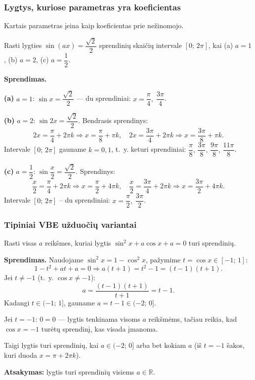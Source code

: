 \subsubsection{Lygtys, kuriose parametras yra koeficientas}

Kartais parametras įeina kaip koeficientas prie nežinomojo.

\begin{example}
Rasti lygties \(\sin(ax) = \dfrac{\sqrt{2}}{2}\) sprendinių skaičių intervale \([0;\, 2\pi]\), kai (a) \(a = 1\), (b) \(a = 2\), (c) \(a = \dfrac{1}{2}\).

\textbf{Sprendimas.}

\textbf{(a)} \(a = 1\): \(\sin x = \dfrac{\sqrt{2}}{2}\) — du sprendiniai: \(x = \dfrac{\pi}{4},\; \dfrac{3\pi}{4}\).

\textbf{(b)} \(a = 2\): \(\sin 2x = \dfrac{\sqrt{2}}{2}\). Bendrasis sprendinys:
\[
2x = \frac{\pi}{4} + 2\pi k \Rightarrow x = \frac{\pi}{8} + \pi k, \quad
2x = \frac{3\pi}{4} + 2\pi k \Rightarrow x = \frac{3\pi}{8} + \pi k.
\]
Intervale \([0;\, 2\pi]\) gauname \(k = 0, 1\), t.~y. keturi sprendiniai: \(\dfrac{\pi}{8},\, \dfrac{3\pi}{8},\, \dfrac{9\pi}{8},\, \dfrac{11\pi}{8}\).

\textbf{(c)} \(a = \dfrac{1}{2}\): \(\sin\dfrac{x}{2} = \dfrac{\sqrt{2}}{2}\). Sprendinys:
\[
\frac{x}{2} = \frac{\pi}{4} + 2\pi k \Rightarrow x = \frac{\pi}{2} + 4\pi k, \quad
\frac{x}{2} = \frac{3\pi}{4} + 2\pi k \Rightarrow x = \frac{3\pi}{2} + 4\pi k.
\]
Intervale \([0;\, 2\pi]\) – du sprendiniai: \(x = \dfrac{\pi}{2},\; \dfrac{3\pi}{2}\).
\end{example}

\subsubsection{Tipiniai VBE užduočių variantai}

\begin{exercise}
Rasti visas \(a\) reikšmes, kuriai lygtis \(\sin^2 x + a\cos x + a = 0\) turi sprendinių.

\textbf{Sprendimas.} Naudojame \(\sin^2 x = 1 - \cos^2 x\), pažymime \(t = \cos x \in [-1;\, 1]\):
\[
1 - t^2 + at + a = 0 \Rightarrow a(t + 1) = t^2 - 1 = (t-1)(t+1).
\]
Jei \(t \neq -1\) (t.~y. \(\cos x \neq -1\)):
\[
a = \frac{(t-1)(t+1)}{t+1} = t - 1.
\]
Kadangi \(t \in (-1;\, 1]\), gauname \(a = t - 1 \in (-2;\, 0]\).

Jei \(t = -1\): \(0 = 0\) — lygtis tenkinama visoms \(a\) reikšmėms, tačiau reikia, kad \(\cos x = -1\) turėtų sprendinį, kas visada įmanoma.

Taigi lygtis turi sprendinių, kai \(a \in (-2;\, 0]\) arba bet kokiam \(a\) (iš \(t = -1\) šakos, kuri duoda \(x = \pi + 2\pi k\)).

\textbf{Atsakymas:} lygtis turi sprendinių visiems \(a \in \mathbb{R}\).
\end{exercise}

